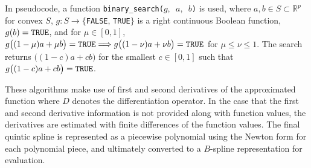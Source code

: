 \documentclass{scspaperproc}
\theoremstyle{scsthe}
\begin{document}
In pseudocode, a function \texttt{binary\_search($g,$ $a,$ $b$)} is used, where $a,b\in S\subset \mathbb{R}^p$ for convex $S$, $g: S \rightarrow \{$\texttt{FALSE}, \texttt{TRUE}$\}$ is a right continuous Boolean function, $g(b) = \hbox{\texttt{TRUE}}$, and for $\mu \in [0,1]$, $g\big((1-\mu)a + \mu b\big) =\hbox{\texttt{TRUE}} \Longrightarrow g\big((1-\nu)a + \nu b\big) =\hbox{\texttt{TRUE}}$ for $\mu \le \nu\le1$. The search returns $\big((1-c)a + c b\big)$ for the smallest $c \in [0,1]$ such that $g\big((1-c)a + c b\big) = \hbox{\texttt{TRUE}}$.

These algorithms make use of first and second derivatives of the approximated function where $D$ denotes the differentiation operator. In the case that the first and second derivative information is not provided along with function values, the derivatives are estimated with finite differences of the function values. The final quintic spline is represented as a piecewise polynomial using the Newton form for each polynomial piece, and ultimately converted to a $B$-spline representation for evaluation.
\end{document}
